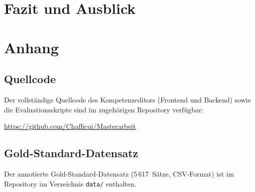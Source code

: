 \documentclass[12pt,oneside]{article}
\begin{document}
\section{Fazit und Ausblick}\label{sec:fazit}


\clearpage
\def\UrlBreaks{\do\/\do-} %



\appendix

\section{Anhang}\label{sec:anhang}

\subsection*{Quellcode}
Der vollständige Quellcode des Kompetenzeditors (Frontend und Backend) sowie die Evaluationsskripte sind im zugehörigen Repository verfügbar:

\url{https://github.com/Chafficui/Masterarbeit}

\subsection*{Gold-Standard-Datensatz}
Der annotierte Gold-Standard-Datensatz (5\,617~Sätze, CSV-Format) ist im Repository im Verzeichnis \texttt{data/} enthalten.

\clearpage


\end{document}
